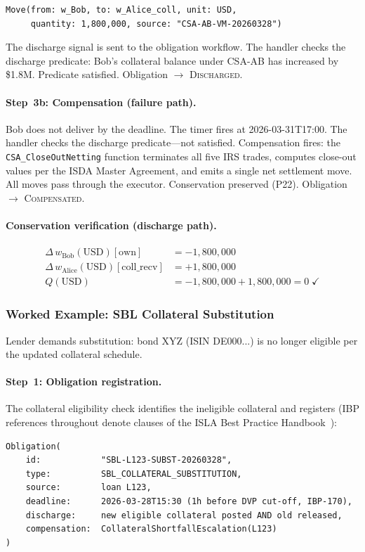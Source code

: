 \documentclass[11pt,a4paper]{article}
\begin{document}
\begin{lstlisting}
Move(from: w_Bob, to: w_Alice_coll, unit: USD,
     quantity: 1,800,000, source: "CSA-AB-VM-20260328")
\end{lstlisting}

\noindent The discharge signal is sent to the obligation workflow. The handler checks the discharge predicate: Bob's collateral balance under CSA-AB has increased by \$1.8M. Predicate satisfied. Obligation $\to$ \textsc{Discharged}.

\paragraph{Step~3b: Compensation (failure path).} Bob does not deliver by the deadline. The timer fires at 2026-03-31T17:00. The handler checks the discharge predicate---not satisfied. Compensation fires: the \texttt{CSA\_CloseOutNetting} function terminates all five IRS trades, computes close-out values per the ISDA Master Agreement, and emits a single net settlement move. All moves pass through the executor. Conservation preserved (P22). Obligation $\to$ \textsc{Compensated}.

\paragraph{Conservation verification (discharge path).}
\begin{align*}
\Delta\, w_{\mathrm{Bob}}(\text{USD})[\mathrm{own}] &= -1{,}800{,}000 \\
\Delta\, w_{\mathrm{Alice}}(\text{USD})[\mathrm{coll\_recv}] &= +1{,}800{,}000 \\
Q(\text{USD}) &= -1{,}800{,}000 + 1{,}800{,}000 = 0 \;\checkmark
\end{align*}

\subsubsection{Worked Example: SBL Collateral Substitution}
\label{sec:obligation-example-sbl}

Lender demands substitution: bond XYZ (ISIN DE000...) is no longer eligible per the updated collateral schedule.

\paragraph{Step~1: Obligation registration.} The collateral eligibility check identifies the ineligible collateral and registers (IBP references throughout denote clauses of the ISLA Best Practice Handbook~\cite{isla-ibp}):
\begin{lstlisting}
Obligation(
    id:            "SBL-L123-SUBST-20260328",
    type:          SBL_COLLATERAL_SUBSTITUTION,
    source:        loan L123,
    deadline:      2026-03-28T15:30 (1h before DVP cut-off, IBP-170),
    discharge:     new eligible collateral posted AND old released,
    compensation:  CollateralShortfallEscalation(L123)
)
\end{lstlisting}
\end{document}
